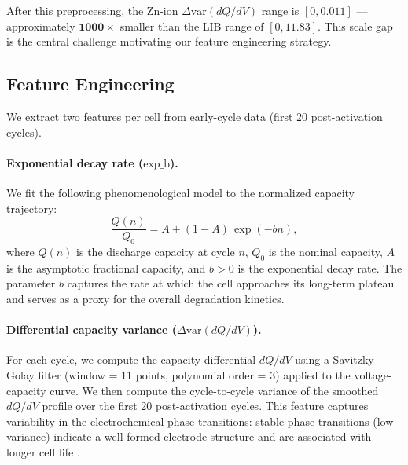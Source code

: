 \documentclass[12pt]{article}
\begin{document}
After this preprocessing, the Zn-ion $\Delta\mathrm{var}(dQ/dV)$ range is
$[0, 0.011]$ --- approximately $\mathbf{1000\times}$ smaller than the LIB
range of $[0, 11.83]$. This scale gap is the central challenge motivating our
feature engineering strategy.

\subsection{Feature Engineering}

We extract two features per cell from early-cycle data (first 20
post-activation cycles).

\paragraph{Exponential decay rate ($\text{exp\_b}$).}
We fit the following phenomenological model to the normalized capacity trajectory:
\begin{equation}
  \frac{Q(n)}{Q_0} = A + (1 - A)\,\exp(-bn),
  \label{eq:exp_decay}
\end{equation}
where $Q(n)$ is the discharge capacity at cycle $n$, $Q_0$ is the nominal
capacity, $A$ is the asymptotic fractional capacity, and $b > 0$ is the
exponential decay rate. The parameter $b$ captures the rate at which the cell
approaches its long-term plateau and serves as a proxy for the overall
degradation kinetics.

\paragraph{Differential capacity variance ($\Delta\mathrm{var}(dQ/dV)$).}
For each cycle, we compute the capacity differential $dQ/dV$ using a
Savitzky-Golay filter (window = 11 points, polynomial order = 3) applied to
the voltage-capacity curve. We then compute the cycle-to-cycle variance of the
smoothed $dQ/dV$ profile over the first 20 post-activation cycles. This feature
captures variability in the electrochemical phase transitions: stable phase
transitions (low variance) indicate a well-formed electrode structure and are
associated with longer cell life \cite{greenbank2022feature}.
\end{document}
